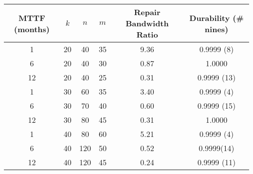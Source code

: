 \begin{table}[H]\centering


\begin{tabular}{| c | c c c | c | c|}\hline
MTTF (months) &$k$& $n$ & $m$ &Repair Bandwidth Ratio&Durability (\# nines) \\\hline 
1 &20& 40 & 35 & 9.36 & 0.9999 (8) \\ 
6 &20& 40 & 30 & 0.87 & 1.0000 \\  
12 &20& 40 & 25 & 0.31 & 0.9999 (13)\\\hline

1 &30& 60 & 35 & 3.40 &0.9999 (4)\\  
6 &30& 70 & 40 & 0.60 &0.9999 (15)\\  
12 &30& 80 & 45 & 0.31 &1.0000 \\\hline

1 &40& 80 & 60 & 5.21 &0.9999 (4)\\  
6 &40&120&50 & 0.52 &0.9999(14)\\  
12 &40&120&45 & 0.24 &0.9999 (11)\\\hline

\end{tabular}
\end{table}
